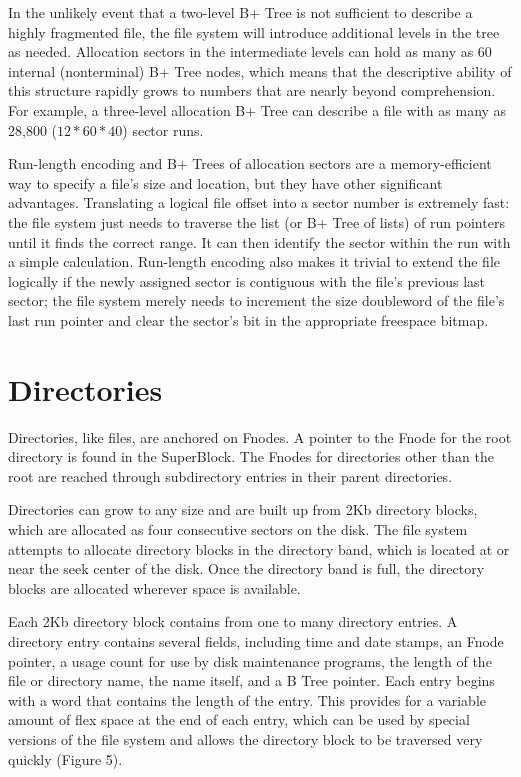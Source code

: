 In the unlikely event that a two-level B+ Tree is not sufficient to describe
a highly fragmented file, the file system will introduce additional levels in
the tree as needed.  Allocation sectors in the intermediate levels can hold
as many as 60 internal (nonterminal) B+ Tree nodes, which means that the
descriptive ability of this structure rapidly grows to numbers that are
nearly beyond comprehension.  For example, a three-level allocation B+ Tree
can describe a file with as many as 28,800 ($12*60*40$) sector runs.
 
Run-length encoding and B+ Trees of allocation sectors are a memory-efficient
way to specify a file's size and location, but they have other significant
advantages.  Translating a logical file offset into a sector number is
extremely fast: the file system just needs to traverse the list (or B+ Tree
of lists) of run pointers until it finds the correct range. It can then
identify the sector within the run with a simple calculation.  Run-length
encoding also makes it trivial to extend the file logically if the newly
assigned sector is contiguous with the file's previous last sector; the file
system merely needs to increment the size doubleword of the file's last run
pointer and clear the sector's bit in the appropriate freespace bitmap.
 
\section{\heads Directories}
 
Directories, like files, are anchored on Fnodes.  A pointer to the Fnode for
the root directory is found in the SuperBlock.  The Fnodes for directories
other than the root are reached through subdirectory entries in their parent
directories.
 
Directories can grow to any size and are built up from 2Kb directory blocks,
which are allocated as four consecutive sectors on the disk.  The file system
attempts to allocate directory blocks in the directory band, which is located
at or near the seek center of the disk.  Once the directory band is full, the
directory blocks are allocated wherever space is available.
 
Each 2Kb directory block contains from one to many directory entries.  A
directory entry contains several fields, including time and date stamps, an
Fnode pointer, a usage count for use by disk maintenance programs, the length
of the file or directory name, the name itself, and a B Tree pointer.  Each
entry begins with a word that contains the length of the entry.  This
provides for a variable amount of flex space at the end of each entry, which
can be used by special versions of the file system and allows the directory
block to be traversed very quickly (Figure 5).
 
